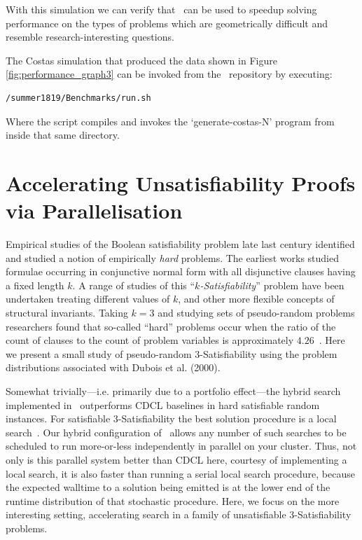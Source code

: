 \documentclass[
10pt, %
a4paper, %
oneside, %
headinclude,footinclude, %
BCOR5mm, %
]{scrartcl}
\begin{document}
With this simulation we can verify that \dagster\ can be used to speedup solving performance on the types of problems which are geometrically difficult and resemble research-interesting questions.

The Costas simulation that produced the data shown in Figure \ref{fig:performance_graph3} can be invoked from the \dagster\ repository by executing:
\begin{verbatim}
/summer1819/Benchmarks/run.sh
\end{verbatim}
Where the script compiles and invokes the `generate-costas-N' program from inside that same directory.






\clearpage
\section{Accelerating Unsatisfiability Proofs via Parallelisation}

Empirical studies of the Boolean satisfiability problem late last century identified and studied a notion of empirically {\em hard} problems.
The earliest works studied formulae occurring in conjunctive normal form with all disjunctive clauses having a fixed length $k$.
A range of studies of this ``{\em $k$-Satisfiability}'' problem have been undertaken treating different values of $k$, and other more flexible concepts of structural invariants.
Taking $k=3$ and studying sets of pseudo-random problems researchers found that so-called ``hard'' problems occur when the ratio of the count of clauses to the count of problem variables is approximately $4.26$~\cite{cheeseman:etal:1991}. 
Here we present a small study of pseudo-random $3$-Satisfiability using the problem distributions associated with Dubois et al. (2000)\cite{dubois:etal:2000}.

Somewhat trivially---i.e. primarily due to a portfolio effect---the hybrid search implemented in \dagster\ outperforms CDCL baselines in hard satisfiable random instances.
For satisfiable $3$-Satisfiability the best solution procedure is a local search~\cite{pham:etal:2008}. 
Our hybrid configuration of  \dagster\ allows any number of such searches to be scheduled to run more-or-less independently in parallel on your cluster.
Thus, not only is this parallel system better than CDCL here, courtesy of implementing a local search, it is also faster than running a serial local search procedure, because the expected walltime to a solution being emitted is at the lower end of the runtime distribution of that stochastic procedure.
Here, we focus on the more interesting setting, accelerating search in a family of unsatisfiable $3$-Satisfiability problems.
\end{document}
